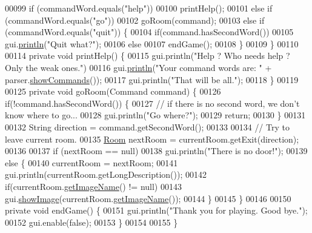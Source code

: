 \begin{DoxyCode}
00099         \textcolor{keywordflow}{if} (commandWord.equals(\textcolor{stringliteral}{"help"}))
00100             printHelp();
00101         \textcolor{keywordflow}{else} \textcolor{keywordflow}{if} (commandWord.equals(\textcolor{stringliteral}{"go"}))
00102             goRoom(command);
00103         \textcolor{keywordflow}{else} \textcolor{keywordflow}{if} (commandWord.equals(\textcolor{stringliteral}{"quit"})) \{
00104             \textcolor{keywordflow}{if}(command.hasSecondWord())
00105                 gui.\hyperlink{classUserInterface_a79f606b4b1f5d1523e50eea00039ed94}{println}(\textcolor{stringliteral}{"Quit what?"});
00106             \textcolor{keywordflow}{else}
00107                 endGame();
00108         \}
00109     \}
00110 
00114     \textcolor{keyword}{private} \textcolor{keywordtype}{void} printHelp() \{
00115         gui.println(\textcolor{stringliteral}{"Help ? Who needs help ? Only the weak ones."})
00116             gui.\hyperlink{classUserInterface_a79f606b4b1f5d1523e50eea00039ed94}{println}(\textcolor{stringliteral}{"Your command words are: "} + parser.\hyperlink{classParser_ae99d8549c08045804cc52576d7b4b453}{showCommands}());
00117         gui.println(\textcolor{stringliteral}{"That will be all."});
00118     \}
00119 
00125     \textcolor{keyword}{private} \textcolor{keywordtype}{void} goRoom(Command command) \{
00126         \textcolor{keywordflow}{if}(!command.hasSecondWord()) \{
00127             \textcolor{comment}{// if there is no second word, we don't know where to go...}
00128             gui.println(\textcolor{stringliteral}{"Go where?"});
00129             \textcolor{keywordflow}{return};
00130         \}
00131 
00132         String direction = command.getSecondWord();
00133 
00134         \textcolor{comment}{// Try to leave current room.}
00135         \hyperlink{classRoom}{Room} nextRoom = currentRoom.getExit(direction);
00136 
00137         \textcolor{keywordflow}{if} (nextRoom == null)
00138             gui.println(\textcolor{stringliteral}{"There is no door!"});
00139         \textcolor{keywordflow}{else} \{
00140             currentRoom = nextRoom;
00141             gui.println(currentRoom.getLongDescription());
00142             \textcolor{keywordflow}{if}(currentRoom.\hyperlink{classRoom_a8177668df4d8be718812934673c42649}{getImageName}() != null)
00143                 gui.\hyperlink{classUserInterface_ab793a0f12878c698ba3e1720a9f86f3b}{showImage}(currentRoom.\hyperlink{classRoom_a8177668df4d8be718812934673c42649}{getImageName}());
00144         \}
00145     \}
00146 
00150     \textcolor{keyword}{private} \textcolor{keywordtype}{void} endGame() \{
00151         gui.println(\textcolor{stringliteral}{"Thank you for playing.  Good bye."});
00152         gui.enable(\textcolor{keyword}{false});
00153     \}
00154 
00155 \}
\end{DoxyCode}
